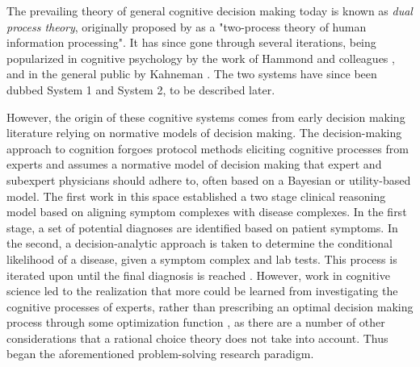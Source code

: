 The prevailing theory of general cognitive decision making today is known as \emph{dual process theory}, originally proposed by \citet{shiffrinControlledAutomaticHuman1977} as a "two-process theory of human information processing". It has since gone through several iterations, being popularized in cognitive psychology by the work of Hammond and colleagues \citep{epsteinIntegrationCognitivePsychodynamic1994, hammondHumanJudgementSocial1996}, and in the general public by Kahneman \citep{kahneman2011thinking}. The two systems have since been dubbed System 1 and System 2, to be described later. 

However, the origin of these cognitive systems comes from early decision making literature relying on normative models of decision making. The decision-making approach to cognition forgoes protocol methods eliciting cognitive processes from experts and assumes a normative model of decision making that expert and subexpert physicians should adhere to, often based on a Bayesian or utility-based model. The first work in this space established a two stage clinical reasoning model based on aligning symptom complexes with disease complexes. In the first stage, a set of potential diagnoses are identified based on patient symptoms. In the second, a decision-analytic approach is taken to determine the conditional likelihood of a disease, given a symptom complex and lab tests. This process is iterated upon until the final diagnosis is reached \citep{ledley1959reasoning}. However, work in cognitive science led to the realization that more could be learned from investigating the cognitive processes of experts, rather than prescribing an optimal decision making process through some optimization function \citep{patelEmergingParadigmsCognition2002}, as there are a number of other considerations that a rational choice theory does not take into account. Thus began the aforementioned problem-solving research paradigm. 

